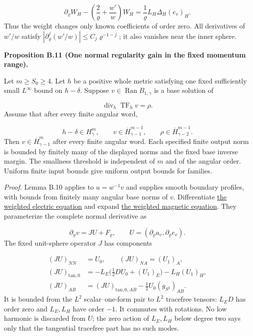\documentclass[
  english,
  11pt,
  reqno]{amsart}
\makeatletter
\newcommand{\pandocstatementheading}[1]{%
  \par\addpenalty{\@beginparpenalty}%
  \addvspace{.5\baselineskip plus .2\baselineskip minus .2\baselineskip}%
  {\normalfont\bfseries #1\par}%
  \nobreak\@afterindenttrue\@afterheading
}
\makeatother
\begin{document}
\label{eq:online-momentum-weighted-magnetic} \[
\partial_\varrho W_H
 -\left(\frac2\varrho+\frac{w'}w\right)W_H
 =\frac1\varrho L_H\Delta_H(e_v)_H.
\] Thus the weight changes only known coefficients of order zero. All
derivatives of \(w'/w\) satisfy
\(|\partial_\varrho^j(w'/w)|\le C_j\varrho^{-1-j}\); it also vanishes
near the inner sphere.

\pandocstatementheading{\leavevmode{}\label{prop:online-momentum-one-normal-gain}Proposition B.11 (One normal regularity gain in the fixed momentum
range).}

Let \(m\ge S_0\ge4\). Let \(h\) be a positive whole metric satisfying
one fixed sufficiently small \(L^\infty\) bound on \(h-\delta\). Suppose
\(v\in\operatorname{Ran}B_{1,\gamma}\) is a base solution of

\label{eq:online-momentum-variable-metric-equation} \[
\operatorname{div}_h\operatorname{TF}_h v=\rho.
\] Assume that after every finite angular word,

\label{eq:online-momentum-gain-hypotheses} \[
h-\delta\in H^m_\gamma,\qquad
v\in\overline H^{m-1}_{\gamma-1},\qquad
\rho\in\overline H^{m-1}_{\gamma-2}.
\] Then \(v\in\overline H^m_{\gamma-1}\) after every finite angular
word. Each specified finite output norm is bounded by finitely many of
the displayed norms and the fixed base inverse margin. The smallness
threshold is independent of \(m\) and of the angular order. Uniform
finite input bounds give uniform output bounds for families.

\emph{Proof.} Lemma B.10 applies to \(u=w^{-1}v\) and supplies smooth
boundary profiles, with bounds from finitely many angular base norms of
\(v\). Differentiate \hyperref[eq:online-momentum-weighted-electric]{the
weighted electric equation} and expand
\hyperref[eq:online-momentum-weighted-magnetic]{the weighted magnetic
equation}. They parameterize the complete normal derivative as

\label{eq:online-extension-momentum-normal-system} \[
\partial_\varrho v=JU+F_\varrho,
\qquad U=(\partial_\varrho a_v,\partial_\varrho e_v).
\] The fixed unit-sphere operator \(J\) has components

\label{eq:online-momentum-normal-J} \[
\begin{aligned}
(JU)_{NN}&=U_0,\qquad (JU)_{NA}=(U_1)_A,\\
(JU)_{\mathrm{tan},0}
 &=-L_E\bigl(\tfrac12DU_0+(U_1)_E\bigr)-L_H(U_1)_H,\\
(JU)_{AB}
 &=(JU)_{\mathrm{tan},0,AB}-\tfrac12U_0(g_{S^2})_{AB}.
\end{aligned}
\] It is bounded from the \(L^2\) scalar--one-form pair to \(L^2\)
tracefree tensors: \(L_ED\) has order zero and \(L_E,L_H\) have order
\(-1\). It commutes with rotations. No low harmonic is discarded from
\(U\); the zero action of \(L_E,L_H\) below degree two says only that
the tangential tracefree part has no such modes.
\end{document}
